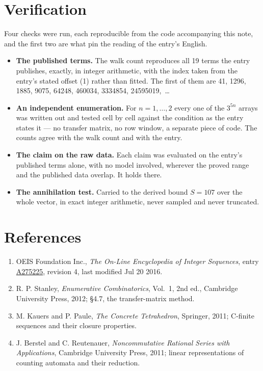 \documentclass[11pt]{article}
\theoremstyle{definition}
\begin{document}
\section{Verification}

Four checks were run, each reproducible from the code accompanying this note, and the first two are what pin the reading of the entry's English.

\begin{itemize}

\item {\bfseries The published terms.} The walk count reproduces all 19 terms the entry publishes, exactly, in integer arithmetic, with the index taken from the entry's stated offset (1) rather than fitted. The first of them are 41, 1296, 1885, 9075, 64248, 460034, 3334854, 24595019,~\dots

\item {\bfseries An independent enumeration.} For $n = 1,\dots,2$ every one of the $3^{5n}$ arrays was written out and tested cell by cell against the condition as the entry states it --- no transfer matrix, no row window, a separate piece of code. The counts agree with the walk count and with the entry.

\item {\bfseries The claim on the raw data.} Each claim was evaluated on the entry's published terms alone, with no model involved, wherever the proved range and the published data overlap. It holds there.

\item {\bfseries The annihilation test.} Carried to the derived bound $S = 107$ over the whole vector, in exact integer arithmetic, never sampled and never truncated.

\end{itemize}

\section{References}

\begin{enumerate}

\item OEIS Foundation Inc., \emph{The On-Line Encyclopedia of Integer Sequences}, entry \href{https://oeis.org/A275225}{A275225}, revision 4, last modified Jul 20 2016.

\item R. P. Stanley, \emph{Enumerative Combinatorics}, Vol.~1, 2nd ed., Cambridge University Press, 2012; \S4.7, the transfer-matrix method.

\item M. Kauers and P. Paule, \emph{The Concrete Tetrahedron}, Springer, 2011; C-finite sequences and their closure properties.

\item J. Berstel and C. Reutenauer, \emph{Noncommutative Rational Series with Applications}, Cambridge University Press, 2011; linear representations of counting automata and their reduction.

\end{enumerate}
\end{document}
